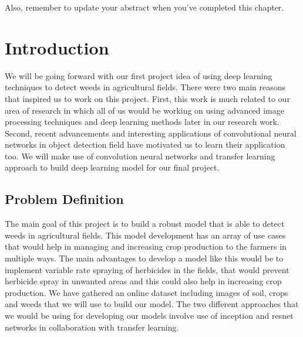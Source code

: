 \documentclass{report}
\begin{document}
Also, remember to update your abstract when you've completed this chapter. 
\fi

\section{Introduction}
We will be going forward with our first project idea of using deep learning techniques to detect weeds in agricultural fields. There were two main reasons that inspired us to work on this project. First, this work is much related to our area of research in which all of us would be working on using advanced image processing techniques and deep learning methods later in our research work. Second, recent advancements and interesting applications of convolutional neural networks in object detection field have motivated us to learn their application too. We will make use of convolution neural networks and transfer learning approach to build deep learning model for our final project. 

\subsection{Problem Definition}
The main goal of this project is to build a robust model that is able to detect weeds in agricultural fields. This model development has an array of use cases that would help in managing and increasing crop production to the farmers in multiple ways. The main advantages to develop a model like this would be to implement variable rate spraying of herbicides in the fields, that would prevent herbicide spray in unwanted areas and this could also help in increasing crop production. We have gathered an online dataset including images of soil, crops and weeds that we will use to build our model. The two different approaches that we would be using for developing our models involve use of inception and resnet networks in collaboration with transfer learning.
\end{document}
